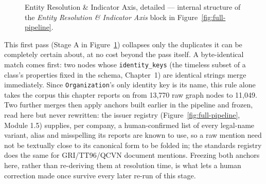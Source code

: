 \documentclass[fontsize=12pt,oneside,headings=small]{scrreprt}
\begin{document}
\begin{figure}[H]
{%
  }
  \caption[Entity Resolution \& Indicator Axis, detailed]{Entity Resolution \&
    Indicator Axis, detailed --- internal structure of the \emph{Entity
    Resolution \& Indicator Axis} block in Figure~\ref{fig:full-pipeline}.}
  \label{fig:entity-resolution-detail}
\end{figure}

This first pass (Stage A in Figure~\ref{fig:entity-resolution-detail}) collapses only the duplicates it can be completely certain about, at no cost beyond the pass itself. A byte-identical match comes first: two nodes whose \texttt{identity\_keys} (the timeless subset of a class's properties fixed in the schema, Chapter~1) are identical strings merge immediately. Since \texttt{Organization}'s only identity key is its name, this rule alone takes the corpus this chapter reports on from 13{,}770 raw graph nodes to 11{,}049. Two further merges then apply anchors built earlier in the pipeline and frozen, read here but never rewritten: the issuer registry (Figure~\ref{fig:full-pipeline}, Module 1.5) supplies, per company, a human-confirmed list of every legal-name variant, alias and misspelling its reports are known to use, so a raw mention need not be textually close to its canonical form to be folded in; the standards registry does the same for GRI/TT96/QCVN document mentions. Freezing both anchors here, rather than re-deriving them at resolution time, is what lets a human correction made once survive every later re-run of this stage.
\end{document}
